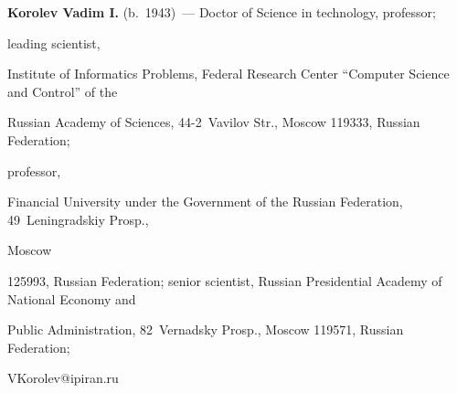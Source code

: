 \vspace*{5pt}



\noindent

\textbf{Korolev Vadim I.} (b.\ 1943)~--- Doctor of Science in technology, professor; 

leading scientist, 

Institute of Informatics Problems, Federal Research Center ``Computer Science and Control'' of the 

Russian Academy of Sciences, 44-2~Vavilov Str., Moscow 119333, Russian Federation; 

professor, 

Financial University under the Government of the Russian Federation, 49~Leningradskiy Prosp., 

Moscow 

125993, Russian Federation; senior scientist, Russian Presidential Academy of National Economy and 

Public Administration, 82~Vernadsky Prosp., Moscow 119571, Russian Federation; 

\mbox{VKorolev@ipiran.ru}

\label{end\stat}





\renewcommand{\bibname}{\protect\rm Литература}

